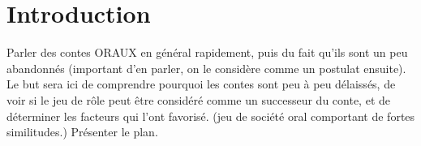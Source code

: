 \section{Introduction}

Parler des contes ORAUX en général rapidement, puis du fait qu'ils sont un peu abandonnés (important d'en parler, on le considère comme un postulat ensuite). Le but sera ici de comprendre pourquoi les contes sont peu à peu délaissés, de voir si le jeu de rôle peut être considéré comme un successeur du conte, et de déterminer les facteurs qui l'ont favorisé. (jeu de société oral comportant de fortes similitudes.)
Présenter le plan.



\clearpage
